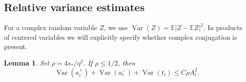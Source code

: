\documentclass[11pt,reqno]{amsart}
\numberwithin{equation}{section}
\theoremstyle{plain}
\newtheorem{lemma}[theorem]{Lemma}
\theoremstyle{definition}
\theoremstyle{remark}
\begin{document}
\subsection{Relative variance estimates}

For a complex random variable $Z$, we use
$\operatorname{Var}(Z)=\mathbb E|Z-\mathbb EZ|^2$.  In products of
centered variables we will explicitly specify whether complex conjugation
is present.

\begin{lemma}\label{lem:coarse-variance}
Set $\rho=4s_*/\eta^2$.  If $\rho\le1/2$, then
\begin{equation}\label{eq:coarse-relative-variance}
 \operatorname{Var}(a_i^+)+\operatorname{Var}(a_i^-)
 +\operatorname{Var}(t_i)\le C\rho A_i^2.
\end{equation}
\end{lemma}
\end{document}
